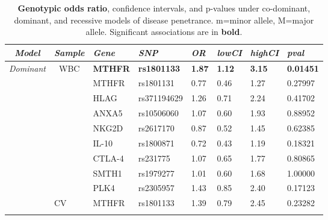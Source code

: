 \begin{table}[!ht]
\caption{\textbf{Genotypic odds ratio}, confidence intervals, and p-values under co-dominant, dominant, and recessive models of disease penetrance. m=minor allele, M=major allele. Significant associations are in \textbf{bold}.} 
    \centering
    \begin{tabular}{llllllll}
\hline
\multicolumn{1}{c}{\textit{\textbf{Model}}} &
  \multicolumn{1}{c}{\textit{\textbf{Sample}}} &
  \textit{\textbf{Gene}} &
  \textit{\textbf{SNP}} &
  \textit{\textbf{OR}} &
  \textit{\textbf{lowCI}} &
  \textit{\textbf{highCI}} &
  \textit{\textbf{pval}} \\ \hline\multicolumn{1}{c}{\multirow{9}{*}{\textit{Dominant}}} &
  \multicolumn{1}{c}{\multirow{9}{*}{WBC}} & \textbf{MTHFR} &
  \textbf{rs1801133} &
  \textbf{1.87} &
  \textbf{1.12} &
  \textbf{3.15} &
  \textbf{0.01451} \\ \cline{3-8} 
\multicolumn{1}{c}{} & \multicolumn{1}{c}{} & MTHFR          & rs1801131          & 0.77          & 0.46          & 1.27          & 0.27997          \\ \cline{3-8} 
\multicolumn{1}{c}{} & \multicolumn{1}{c}{} & HLAG           & rs371194629        & 1.26          & 0.71          & 2.24          & 0.41702          \\ \cline{3-8} 
\multicolumn{1}{c}{} & \multicolumn{1}{c}{} & ANXA5          & rs10506060         & 1.07          & 0.60          & 1.93          & 0.88952          \\ \cline{3-8} 
\multicolumn{1}{c}{} & \multicolumn{1}{c}{} & NKG2D          & rs2617170          & 0.87          & 0.52          & 1.45          & 0.62385          \\ \cline{3-8} 
\multicolumn{1}{c}{} & \multicolumn{1}{c}{} & IL-10          & rs1800871          & 0.72          & 0.43          & 1.19          & 0.18321          \\ \cline{3-8} 
\multicolumn{1}{c}{} & \multicolumn{1}{c}{} & CTLA-4         & rs231775           & 1.07          & 0.65          & 1.77          & 0.80865          \\ \cline{3-8} 
\multicolumn{1}{c}{} & \multicolumn{1}{c}{} & SMTH1          & rs1979277          & 1.01          & 0.60          & 1.68          & 1.00000          \\ \cline{3-8} 
\multicolumn{1}{c}{} & \multicolumn{1}{c}{} & PLK4           & rs2305957          & 1.43          & 0.85          & 2.40          & 0.17123          \\ \hline
\multirow{9}{*}{}    & \multirow{9}{*}{CV}  & MTHFR          & rs1801133          & 1.39          & 0.79          & 2.45          & 0.23282          \\ \cline{3-8} 

\end{tabular}
\end{table}
